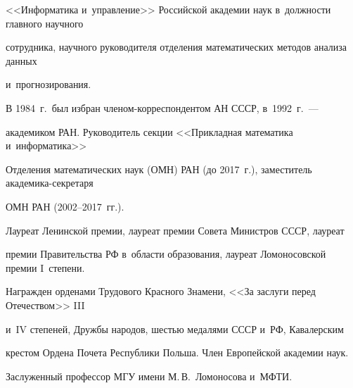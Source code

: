 <<Информатика и~управление>> Российской академии наук в~должности главного научного 


сотрудника, научного руководителя отделения математических методов анализа данных 


и~прогнозирования. 


      


      В 1984~г.\ был избран чле\-ном-кор\-рес\-пон\-ден\-том АН СССР, в~1992~г.~--- 


академиком РАН. Руководитель секции <<Прикладная математика и~информатика>> 


Отделения математических наук (ОМН) РАН (до 2017~г.), заместитель академика-секретаря 


ОМН РАН (2002--2017~гг.).


      


      Лауреат Ленинской премии, лауреат премии Совета Министров СССР, лауреат 


премии Правительства РФ в~области образования, лауреат Ломоносовской премии I~степени. 


Награжден орденами Трудового Красного Знамени, <<За заслуги перед Отечеством>> III 


и~IV степеней, Дружбы народов, \mbox{шестью} медалями СССР и~РФ, Кавалерским 


крестом Ордена Почета Республики Польша. Член Европейской академии наук. 


Заслуженный профессор МГУ имени М.\,В.~Ломоносова и~МФТИ.


      


      





\pagebreak





\





\vspace*{-12pt}










